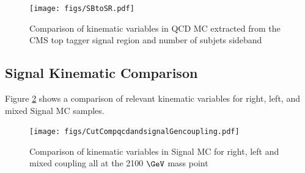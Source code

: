 \begin{figure}[Htcb]
\centering
\texttt{[image: figs/SBtoSR.pdf]}
\caption{Comparison of kinematic variables in QCD MC extracted from the CMS top tagger signal region and number of subjets sideband}
\label{figs:SBtoSR}
\end{figure}



\subsection{Signal Kinematic Comparison}
\label{sec:SigKinGen}
Figure \ref{figs:genkin} shows a comparison of relevant kinematic variables for right, left, and mixed Signal MC samples.


\begin{figure}[Htcb]
\centering
\texttt{[image: figs/CutCompqcdandsignalGencoupling.pdf]}
\caption{Comparison of kinematic variables in Signal MC for right, left and mixed coupling all at the 2100$~\GeV$ mass point }
\label{figs:genkin}
\end{figure}







